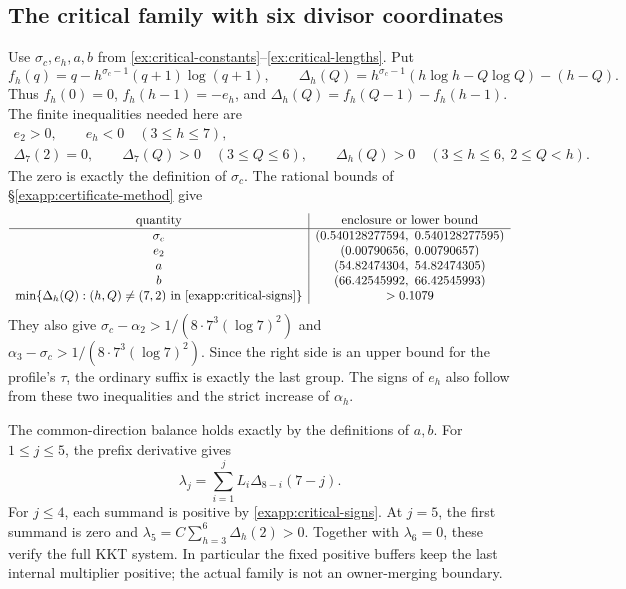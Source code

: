 \subsection{The critical family with six divisor coordinates}

Use \(\sigma_c,e_h,a,b\) from
\eqref{ex:critical-constants}--\eqref{ex:critical-lengths}.  Put
\[
 f_h(q)=q-h^{\sigma_c-1}(q+1)\log(q+1),\qquad
 \Delta_h(Q)=h^{\sigma_c-1}(h\log h-Q\log Q)-(h-Q).
\]
Thus \(f_h(0)=0\), \(f_h(h-1)=-e_h\), and
\(\Delta_h(Q)=f_h(Q-1)-f_h(h-1)\).  The finite inequalities needed
here are
\begin{gather}
 e_2>0,\qquad e_h<0\quad(3\le h\le7),\nonumber\\
 \Delta_7(2)=0,\qquad
 \Delta_7(Q)>0\quad(3\le Q\le6),\qquad
 \Delta_h(Q)>0\quad(3\le h\le6,\ 2\le Q<h).
 \label{exapp:critical-signs}
\end{gather}
The zero is exactly the definition of \(\sigma_c\).  The rational
bounds of \S\ref{exapp:certificate-method} give
\[
 \begin{array}{c|c}
 \text{quantity}&\text{enclosure or lower bound}\\ \hline
 \sigma_c&(0.540128277594,\ 0.540128277595)\\
 e_2&(0.00790656,\ 0.00790657)\\
 a&(54.82474304,\ 54.82474305)\\
 b&(66.42545992,\ 66.42545993)\\
 \min\{\Delta_h(Q):(h,Q)\ne(7,2)\text{ in \eqref{exapp:critical-signs}}\}
       &>0.1079
 \end{array}
\]
They also give
\(\sigma_c-\alpha_2>1/(8\cdot7^3(\log7)^2)\) and
\(\alpha_3-\sigma_c>1/(8\cdot7^3(\log7)^2)\).
Since the right side is an upper bound for the profile's \(\tau\),
the ordinary suffix is exactly the last group.  The signs of \(e_h\)
also follow from these two inequalities and the strict increase of
\(\alpha_h\).

The common-direction balance holds exactly by the definitions of
\(a,b\).  For \(1\le j\le5\), the prefix derivative gives
\[
 \lambda_j=\sum_{i=1}^jL_i\Delta_{8-i}(7-j).
\]
For \(j\le4\), each summand is positive by
\eqref{exapp:critical-signs}.  At \(j=5\), the first summand is zero
and
\(\lambda_5=C\sum_{h=3}^6\Delta_h(2)>0\).
Together with \(\lambda_6=0\), these verify the full KKT system.
In particular the fixed positive buffers keep the last internal
multiplier positive; the actual family is not an owner-merging boundary.

